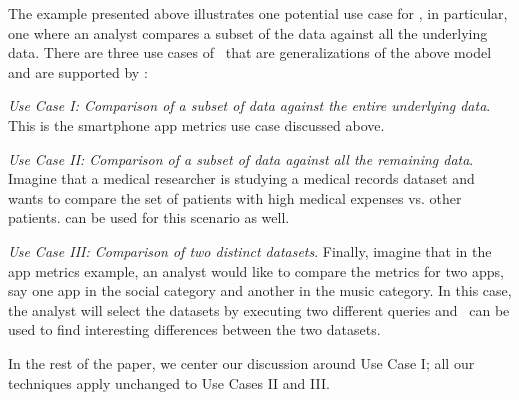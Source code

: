 The example presented above illustrates one potential use case for \VizRecDB,
in particular, one where an analyst compares a subset of the data against all
the underlying data.
There are three use cases of \VizRecDB\ that are generalizations of the above
model and are supported by \VizRecDB:
\begin{denselist}
  \item {\it Use Case I: Comparison of a subset of data against the entire
  underlying data}.
  This is the smartphone app metrics use case discussed above.
  \item {\it Use Case II: Comparison of a subset of data against all the
  remaining data}.
  Imagine that a medical researcher is studying a medical records dataset and
  wants to compare the set of patients with high medical expenses vs. 
  other patients. \VizRecDB can be used for this scenario as well.
  \item {\it Use Case III: Comparison of two distinct datasets}. Finally,
  imagine that in the app metrics example, an analyst would like to compare
  the metrics for two apps, say one app in the social category and another in
  the music category. In this case, the analyst will select the datasets
  by executing two different queries and \VizRecDB\ can be used to find
  interesting differences between the two datasets.
\end{denselist}
In the rest of the paper, we center our discussion around Use Case I;
all our techniques apply unchanged to Use Cases II and III.

